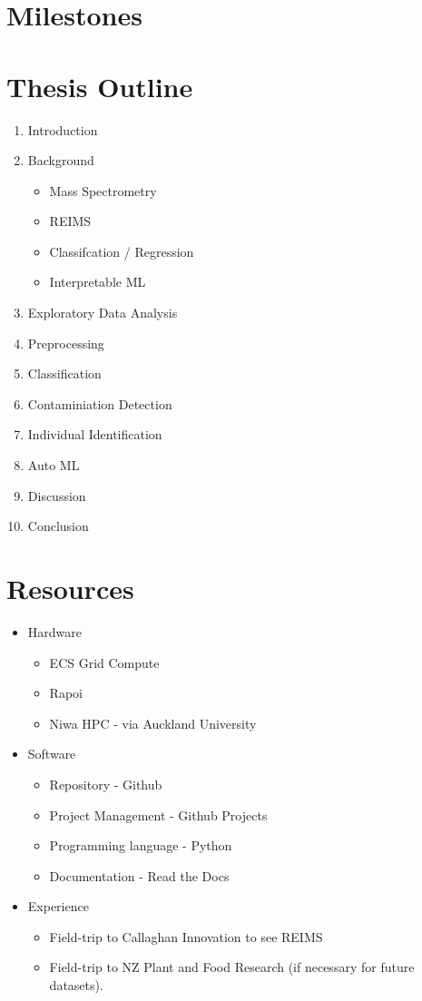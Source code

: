 \documentclass{article}
\begin{document}
\section{Milestones}
\label{sec:milestones}

\section{Thesis Outline}
\label{sec:outline}

\begin{enumerate}
  \item Introduction 
  \item Background 
  \begin{itemize}
    \item Mass Spectrometry 
    \item REIMS 
    \item Classifcation / Regression 
    \item Interpretable ML
  \end{itemize}
  \item Exploratory Data Analysis 
  \item Preprocessing 
  \item Classification 
  \item Contaminiation Detection 
  \item Individual Identification 
  \item Auto ML 
  \item Discussion 
  \item Conclusion
\end{enumerate}

\section{Resources}
\label{sec:resources}

\begin{itemize}
  \item Hardware 
  \begin{itemize}
    \item ECS Grid Compute 
    \item Rapoi 
    \item Niwa HPC - via Auckland University
  \end{itemize}
  \item Software 
  \begin{itemize}
    \item Repository - Github 
    \item Project Management - Github Projects 
    \item Programming language - Python
    \item Documentation - Read the Docs  
  \end{itemize}
  \item Experience 
  \begin{itemize}
    \item Field-trip to Callaghan Innovation to see REIMS 
    \item Field-trip to NZ Plant and Food Research (if necessary for future datasets). 
  \end{itemize}
\end{itemize}
\end{document}

